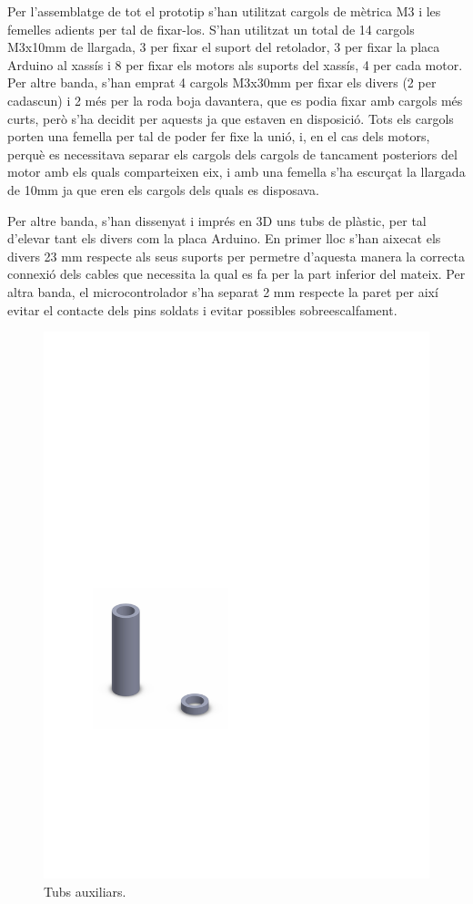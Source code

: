 Per l’assemblatge de tot el prototip s’han utilitzat cargols de mètrica M3 i les femelles adients per tal de fixar-los. S’han utilitzat un total de 14 cargols M3x10mm de llargada, 3 per fixar el suport del retolador, 3 per fixar la placa Arduino al xassís i 8 per fixar els motors als suports del xassís, 4 per cada motor. Per altre banda, s’han emprat 4 cargols M3x30mm per fixar els divers (2 per cadascun) i 2 més per la roda boja davantera, que es podia fixar amb cargols més curts, però s’ha decidit per aquests ja que estaven en disposició. Tots els cargols porten una femella per tal de poder fer fixe la unió, i, en el cas dels motors, perquè es necessitava separar els cargols dels cargols de tancament posteriors del motor amb els quals comparteixen eix, i amb una femella s’ha escurçat la llargada de 10mm ja que eren els cargols dels quals es disposava. 

Per altre banda, s'han dissenyat i imprés en 3D uns tubs de plàstic, per tal d’elevar tant els divers com la placa Arduino. En primer lloc s’han aixecat els divers 23 mm respecte als seus suports per permetre d’aquesta manera la correcta connexió dels cables que necessita la qual es fa per la part inferior del mateix. Per altra banda, el microcontrolador s’ha separat 2 mm respecte la paret per així evitar el contacte dels pins soldats i evitar possibles sobreescalfament. 

\begin{figure}[H]
	\centering
	\includegraphics{tubs}
	\caption{Tubs auxiliars.}
	\label{fig:tubs}
\end{figure}
